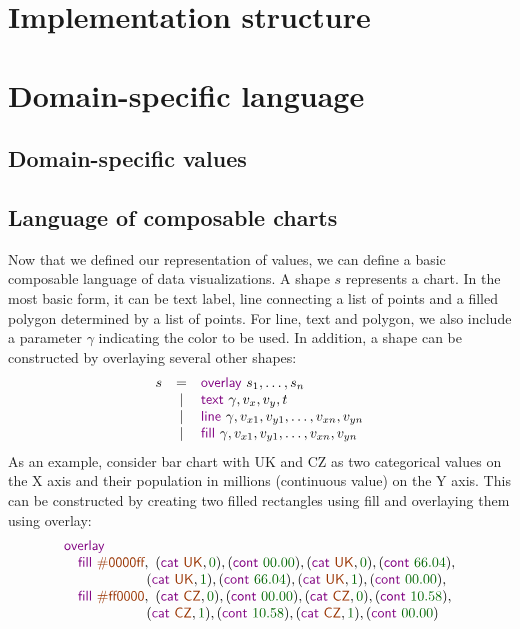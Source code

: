 \documentclass{jfp}
\newcommand{\num}[1]{\textcolor{numclr}{#1}}
\newcommand{\strf}[1]{\textnormal{\textcolor{strclr}{\sffamily #1}}}
\newcommand{\kvd}[1]{\textnormal{\textcolor{kvdclr}{\sffamily #1}}}
\begin{document}
\section{Implementation structure}

\newpage

\section{Domain-specific language}
\label{sec:intro}
\subsection*{Domain-specific values}


\subsection*{Language of composable charts}
Now that we defined our representation of values, we can define a basic composable language of
data visualizations. A shape $s$ represents a chart. In the most basic form, it can be text label,
line connecting a list of points and a filled polygon determined by a list of points. For line,
text and polygon, we also include a parameter $\gamma$ indicating the color to be used. In addition,
a shape can be constructed by overlaying several other shapes:
%
\begin{equation*}
\begin{array}{rcl}
s & = & \kvd{overlay}~s_1, \ldots, s_n\\
 & | & \kvd{text}~\gamma, v_x, v_y, t\\
 & | & \kvd{line}~\gamma, v_{x1}, v_{y1}, \ldots, v_{xn}, v_{yn}\\
 & | & \kvd{fill}~\gamma, v_{x1}, v_{y1}, \ldots, v_{xn}, v_{yn}
\end{array}
\end{equation*}
%
As an example, consider bar chart with \strf{UK} and \strf{CZ} as two categorical values on the X
axis and their population in millions (continuous value) on the Y axis. This can be constructed by
creating two filled rectangles using \kvd{fill} and overlaying them using \kvd{overlay}:
%
\begin{equation*}
\begin{array}{l}
\kvd{overlay}\\
\quad \kvd{fill}~\strf{\#0000ff},
 ~(\kvd{cat}~\strf{UK}, \num{0}), (\kvd{cont}~\num{00.00}), (\kvd{cat}~\strf{UK}, \num{0}), (\kvd{cont}~\num{66.04}),\\
\hspace{5.9em}(\kvd{cat}~\strf{UK}, \num{1}), (\kvd{cont}~\num{66.04}), (\kvd{cat}~\strf{UK}, \num{1}), (\kvd{cont}~\num{00.00}),\\
\quad \kvd{fill}~\strf{\#ff0000},
 ~(\kvd{cat}~\strf{CZ}, \num{0}), (\kvd{cont}~\num{00.00}), (\kvd{cat}~\strf{CZ}, \num{0}), (\kvd{cont}~\num{10.58}),\\
\hspace{5.9em}(\kvd{cat}~\strf{CZ}, \num{1}), (\kvd{cont}~\num{10.58}), (\kvd{cat}~\strf{CZ}, \num{1}), (\kvd{cont}~\num{00.00})\\
\end{array}
\end{equation*}
\end{document}
